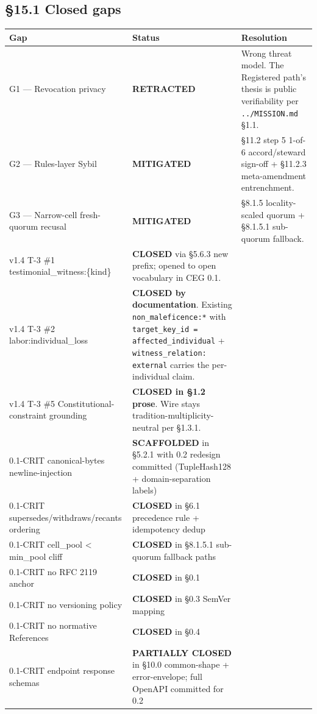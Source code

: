 \documentclass[11pt]{article}
\begin{document}
\subsection*{§15.1 Closed gaps}


{\footnotesize
\begin{longtable}{|p{5.33cm}|p{5.33cm}|p{5.33cm}|}\hline
\textbf{Gap} & \textbf{Status} & \textbf{Resolution} \\ \hline\endhead
G1 — Revocation privacy & \textbf{RETRACTED} & Wrong threat model. The Registered path's thesis is public verifiability per \texttt{../MISSION.md} §1.1. \\ \hline
G2 — Rules-layer Sybil & \textbf{MITIGATED} & §11.2 step 5 1-of-6 accord/steward sign-off + §11.2.3 meta-amendment entrenchment. \\ \hline
G3 — Narrow-cell fresh-quorum recusal & \textbf{MITIGATED} & §8.1.5 locality-scaled quorum + §8.1.5.1 sub-quorum fallback. \\ \hline
v1.4 T-3 \#1 testimonial\_witness:\{kind\} & \textbf{CLOSED} via §5.6.3 new prefix; opened to open vocabulary in CEG 0.1. &  \\ \hline
v1.4 T-3 \#2 labor:individual\_loss & \textbf{CLOSED by documentation}. Existing \texttt{non\_maleficence:*} with \texttt{target\_key\_id = affected\_individual} + \texttt{witness\_relation: external} carries the per-individual claim. &  \\ \hline
v1.4 T-3 \#5 Constitutional-constraint grounding & \textbf{CLOSED in §1.2 prose}. Wire stays tradition-multiplicity-neutral per §1.3.1. &  \\ \hline
0.1-CRIT canonical-bytes newline-injection & \textbf{SCAFFOLDED} in §5.2.1 with 0.2 redesign committed (TupleHash128 + domain-separation labels) &  \\ \hline
0.1-CRIT supersedes/withdraws/recants ordering & \textbf{CLOSED} in §6.1 precedence rule + idempotency dedup &  \\ \hline
0.1-CRIT cell\_pool < min\_pool cliff & \textbf{CLOSED} in §8.1.5.1 sub-quorum fallback paths &  \\ \hline
0.1-CRIT no RFC 2119 anchor & \textbf{CLOSED} in §0.1 &  \\ \hline
0.1-CRIT no versioning policy & \textbf{CLOSED} in §0.3 SemVer mapping &  \\ \hline
0.1-CRIT no normative References & \textbf{CLOSED} in §0.4 &  \\ \hline
0.1-CRIT endpoint response schemas & \textbf{PARTIALLY CLOSED} in §10.0 common-shape + error-envelope; full OpenAPI committed for 0.2 &  \\ \hline

\end{longtable}}
\end{document}
